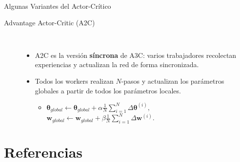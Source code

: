 \documentclass[10pt, envcountsect, handout, aspectratio=1610, hyperref={hypertexnames=true}]{beamer}
\begin{document}
\begin{frame}{Algunas Variantes del Actor-Crítico}
\begin{description}
		\item[Advantage Actor-Critic (A2C)] ~
		\begin{itemize}
			\item A2C es la versión \textbf{síncrona} de A3C: varios trabajadores recolectan experiencias y actualizan la red de forma sincronizada.
			\item Todos los workers realizan $N$-pasos y actualizan los parámetros globales a partir de todos los parámetros locales.
			
			\begin{itemize}
				\item $\bm{\theta}_{global} \leftarrow \bm{\theta}_{global} + \alpha \frac{1}{N} \sum_{i=1}^N \Delta \bm{\theta}^{(i)},$
				\qquad  $\mathbf{w}_{global} \leftarrow \mathbf{w}_{global} + \beta \frac{1}{N} \sum_{i=1}^N \Delta \mathbf{w}^{(i)}.$
			\end{itemize}
		\end{itemize}
		
	\end{description}
\end{frame}









\section{Referencias}



	
\end{document}
